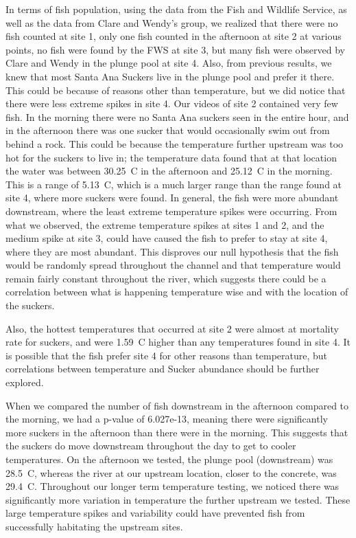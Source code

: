 \documentclass{article}\usepackage[]{graphicx}\usepackage[]{color}
\begin{document}
In terms of fish population, using the data from the Fish and Wildlife Service, as well as the data from Clare and Wendy's group, we realized that there were no fish counted at site 1, only one fish counted in the afternoon at site 2 at various points, no fish were found by the FWS at site 3, but many fish were observed by Clare and Wendy in the plunge pool at site 4. Also, from previous results, we knew that most Santa Ana Suckers live in the plunge pool and prefer it there. This could be because of reasons other than temperature, but we did notice that there were less extreme spikes in site 4. Our videos of site 2 contained very few fish. In the morning there were no Santa Ana suckers seen in the entire hour, and in the afternoon there was one sucker that would occasionally swim out from behind a rock.  This could be because the temperature further upstream was too hot for the suckers to live in; the temperature data found that at that location the water was between 30.25\textdegree~C in the afternoon and 25.12\textdegree~C in the morning. This is a range of 5.13\textdegree~C, which is a much larger range than the range found at site 4, where more suckers were found. In general, the fish were more abundant downstream, where the least extreme temperature spikes were occurring. From what we observed, the extreme temperature spikes at sites 1 and 2, and the medium spike at site 3, could have caused the fish to prefer to stay at site 4, where they are most abundant. This disproves our null hypothesis that the fish would be randomly spread throughout the channel and that temperature would remain fairly constant throughout the river, which suggests there could be a correlation between what is happening temperature wise and with the location of the suckers.

Also, the hottest temperatures that occurred at site 2 were almost at mortality rate for suckers, and were 1.59\textdegree~C higher than any temperatures found in site 4. It is possible that the fish prefer site 4 for other reasons than temperature, but correlations between temperature and Sucker abundance should be further explored.

When we compared the number of fish downstream in the afternoon compared to the morning, we had a p-value of 6.027e-13, meaning there were significantly more suckers in the afternoon than there were in the morning.  This suggests that the suckers do move downstream throughout the day to get to cooler temperatures.  On the afternoon we tested, the plunge pool (downstream) was 28.5\textdegree~C, whereas the river at our upstream location, closer to the concrete, was 29.4\textdegree~C. Throughout our longer term temperature testing, we noticed there was significantly more variation in temperature the further upstream we tested. These large temperature spikes and variability could have prevented fish from successfully habitating the upstream sites. 
\end{document}
